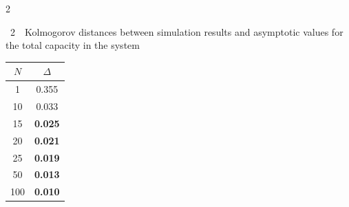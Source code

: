 \begin{multicols}{2}
\begin{center}


\begin{minipage}[t]{34mm}


{{\tablename~2}\ \ \small{Kolmogorov distances between simulation results and asymptotic values for the total capacity in the system}}





\vspace*{6pt}





{\small 


\tabcolsep=14pt


\begin{tabular}{cc}


\hline


$N$ & $\Delta$\\


\hline


\hphantom{9}1 & 0.355\\


10 & 0.033\\


15 & \textbf{0.025}\\


20 & \textbf{0.021}\\


25 & \textbf{0.019}\\


50 & \textbf{0.013}\\


100\hphantom{9} &\textbf{0.010}\\


\hline


\end{tabular}


}


\end{minipage}


\end{center}





\vspace*{9pt}







\setcounter{table}{2}






\end{multicols}
